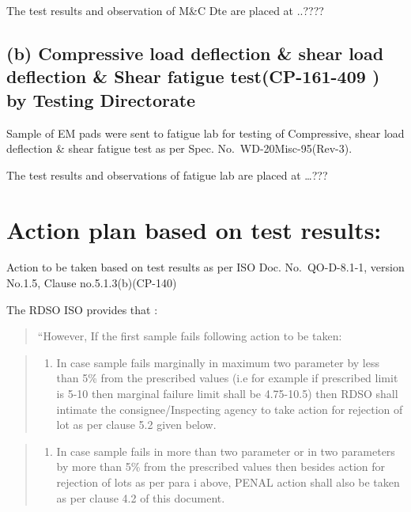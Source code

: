 \documentclass[nofonts,]{tufte-book}
\providecommand{\tightlist}{%
  \setlength{\itemsep}{0pt}\setlength{\parskip}{0pt}}
\begin{document}
The test results and observation of M\&C Dte are placed at ..????

\hypertarget{b-compressive-load-deflection-shear-load-deflection-shear-fatigue-testcp-161-409-by-testing-directorate}{%
\subsection{(b) Compressive load deflection \& shear load deflection \&
Shear fatigue test(CP-161-409 ) by Testing
Directorate}\label{b-compressive-load-deflection-shear-load-deflection-shear-fatigue-testcp-161-409-by-testing-directorate}}

Sample of EM pads were sent to fatigue lab for testing of Compressive,
shear load deflection \& shear fatigue test as per Spec.
No.~WD-20Misc-95(Rev-3).

The test results and observations of fatigue lab are placed at \ldots???

\hypertarget{action-plan-based-on-test-results}{%
\section{Action plan based on test
results:}\label{action-plan-based-on-test-results}}

Action to be taken based on test results as per ISO Doc. No.~QO-D-8.1-1,
version No.1.5, Clause no.5.1.3(b)(CP-140)

The RDSO ISO provides that :

\begin{quote}
``However, If the first sample fails following action to be taken:
\end{quote}

\begin{quote}
\begin{enumerate}
\def\labelenumi{(\roman{enumi})}
\tightlist
\item
  In case sample fails marginally in maximum two parameter by less than
  5\% from the prescribed values (i.e for example if prescribed limit is
  5-10 then marginal failure limit shall be 4.75-10.5) then RDSO shall
  intimate the consignee/Inspecting agency to take action for rejection
  of lot as per clause 5.2 given below.
\end{enumerate}
\end{quote}

\begin{quote}
\begin{enumerate}
\def\labelenumi{(\roman{enumi})}
\setcounter{enumi}{1}
\tightlist
\item
  In case sample fails in more than two parameter or in two parameters
  by more than 5\% from the prescribed values then besides action for
  rejection of lots as per para i above, PENAL action shall also be
  taken as per clause 4.2 of this document.
\end{enumerate}
\end{quote}
\end{document}
